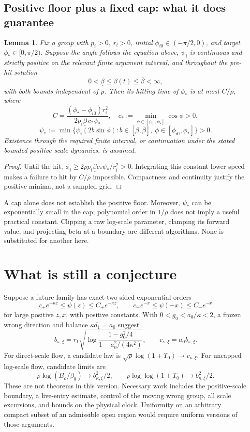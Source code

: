 \documentclass[10pt,a4paper]{article}
\newtheorem{lemma}[proposition]{Lemma}
\begin{document}
\subsection{Positive floor plus a fixed cap: what it does guarantee}
\begin{lemma}
Fix a group with $p_i>0$, $r_i>0$, initial $\phi_{i0}\in(-\pi/2,0)$, and target $\phi_*\in[0,\pi/2)$. Suppose the angle follows the equation above, $\psi_i$ is continuous and strictly positive on the relevant finite argument interval, and throughout the pre-hit solution
\[
0<\underline\beta\le\beta(t)\le\overline\beta<\infty,
\]
with both bounds independent of $\rho$. Then its hitting time of $\phi_*$ is at most $C/\rho$, where
\[
C=\frac{(\phi_*-\phi_{i0})r_i^2}
{2p_i\underline\beta\,c_*\psi_*},\quad
c_*:=\min_{\phi\in[\phi_{i0},\phi_*]}\cos\phi>0,
\]
\[
\psi_*:=\min\{\psi_i(2b\sin\phi):b\in[\underline\beta,\overline\beta],\ \phi\in[\phi_{i0},\phi_*]\}>0.
\]
Existence through the required finite interval, or continuation under the stated bounded positive-scale dynamics, is assumed.
\end{lemma}
\begin{proof}
Until the hit, $\dot\phi_i\ge2\rho p_i\underline\beta c_*\psi_*/r_i^2>0$. Integrating this constant lower speed makes a failure to hit by $C/\rho$ impossible. Compactness and continuity justify the positive minima, not a sampled grid.
\end{proof}
A cap alone does not establish the positive floor. Moreover, $\psi_*$ can be exponentially small in the cap; polynomial order in $1/\rho$ does not imply a useful practical constant. Clipping a raw log-scale parameter, clamping its forward value, and projecting beta at a boundary are different algorithms. None is substituted for another here.

\section{What is still a conjecture}
Suppose a future family has exact two-sided exponential orders
\[
c_+e^{-\kappa z}\le\psi(z)\le C_+e^{-\kappa z},\qquad
c_-e^{-x}\le\psi(-x)\le C_-e^{-x}
\]
for large positive $z,x$, with positive constants. With $0<g_0<a_0/\kappa<2$, a frozen wrong direction and balance $\kappa d_1=a_0$ suggest
\[
b_{\kappa,\xi}=r_1\sqrt{\log\frac{1-g_0^2/4}{1-a_0^2/(4\kappa^2)}},\qquad
c_{\kappa,\xi}=a_0b_{\kappa,\xi}.
\]
For direct-scale flow, a candidate law is $\sqrt\rho\log(1+T_0)\to c_{\kappa,\xi}$. For uncapped log-scale flow, candidate limits are
\[
\rho\log(B_\rho/\beta_0)\to b_{\kappa,\xi}^2/2,
\qquad
\rho\log\log(1+T_0)\to b_{\kappa,\xi}^2/2.
\]
These are not theorems in this version. Necessary work includes the positive-scale boundary, a live-entry estimate, control of the moving wrong group, all scale excursions, and bounds on the physical clock. Uniformity on an arbitrary compact subset of an admissible open region would require uniform versions of those arguments.
\end{document}
